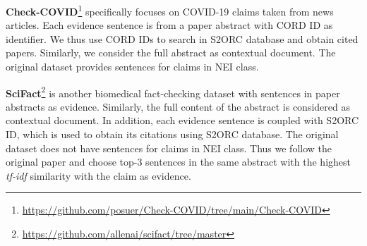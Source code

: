 \textbf{Check-COVID}\footnote{\url{https://github.com/posuer/Check-COVID/tree/main/Check-COVID}} specifically focuses on COVID-19 claims taken from news articles. Each evidence sentence is from a paper abstract with CORD ID as identifier. We thus use CORD IDs to search in S2ORC database and obtain cited papers. Similarly, we consider the full abstract as contextual document. The original dataset provides sentences for claims in NEI class.

\textbf{SciFact}\footnote{\url{https://github.com/allenai/scifact/tree/master}} \cite{scifact} is another biomedical fact-checking dataset with sentences in paper abstracts as evidence. Similarly, the full content of the abstract is considered as contextual document. In addition, each evidence sentence is coupled with S2ORC ID, which is used to obtain its citations using S2ORC database. The original dataset does not have sentences for claims in NEI class. Thus we follow the original paper \cite{scifact} and choose top-3 sentences in the same abstract with the highest \textit{tf-idf} similarity with the claim as evidence.